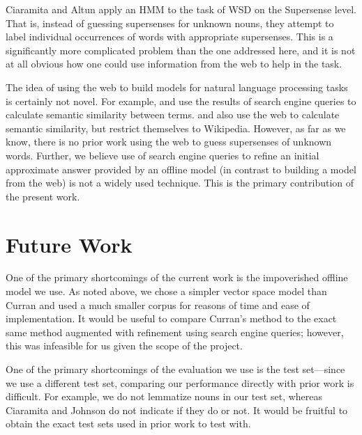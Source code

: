 \documentclass{article}
\begin{document}
Ciaramita and Altun \cite{ciaramita-altun} apply an HMM to the task of WSD on the Supersense level.
That is, instead of guessing supersenses for unknown nouns, they attempt to label individual occurrences of words with appropriate supersenses.
This is a significantly more complicated problem than the one addressed here, and it is not at all obvious how one could use information from the web to help in the task.


The idea of using the web to build models for natural language processing tasks is certainly not novel.
For example, \cite{bollegala} and \cite{gracia} use the results of search engine queries to calculate semantic similarity between terms.
\cite{strube} and \cite{gabrilovich} also use the web to calculate semantic similarity, but restrict themselves to Wikipedia.
However, as far as we know, there is no prior work using the web to guess supersenses of unknown words.
Further, we believe use of search engine queries to refine an initial approximate answer provided by an offline model (in contrast to building a model from the web) is not a widely used technique.
This is the primary contribution of the present work.

\section{Future Work}


One of the primary shortcomings of the current work is the impoverished offline model we use.
As noted above, we chose a simpler vector space model than Curran \cite{curran} and used a much smaller corpus for reasons of time and ease of implementation.
It would be useful to compare Curran's method to the exact same method augmented with refinement using search engine queries; however, this was infeasible for us given the scope of the project.

One of the primary shortcomings of the evaluation we use is the test set---since we use a different test set, comparing our performance directly with prior work is difficult.
For example, we do not lemmatize nouns in our test set, whereas Ciaramita and Johnson \cite{cj} do not indicate if they do or not.
It would be fruitful to obtain the exact test sets used in prior work to test with.
\end{document}
